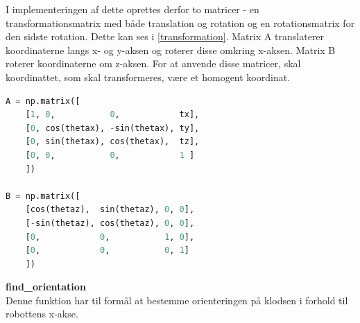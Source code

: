 I implementeringen af dette oprettes derfor to matricer - en transformationsmatrix med både translation og rotation og en rotationsmatrix for den sidste rotation. Dette kan ses i \autoref{transformation}. Matrix A translaterer koordinaterne langs x- og y-aksen og roterer disse omkring x-aksen. Matrix B roterer koordinaterne om z-aksen. For at anvende disse matricer, skal koordinattet, som skal transformeres, være et homogent koordinat.

\begin{lstlisting}[caption=Matricer til transformation., label=transformation, language=Python]
A = np.matrix([
    [1, 0,           0,            tx],
    [0, cos(thetax), -sin(thetax), ty],
    [0, sin(thetax), cos(thetax),  tz],
    [0, 0,           0,            1 ]
    ])

B = np.matrix([
    [cos(thetaz),  sin(thetaz), 0, 0],
    [-sin(thetaz), cos(thetaz), 0, 0],
    [0,            0,           1, 0],
    [0,            0,           0, 1]
    ])
\end{lstlisting}


\textbf{find\_orientation} \\
Denne funktion har til formål at bestemme orienteringen på klodsen i forhold til robottens x-akse.\\

